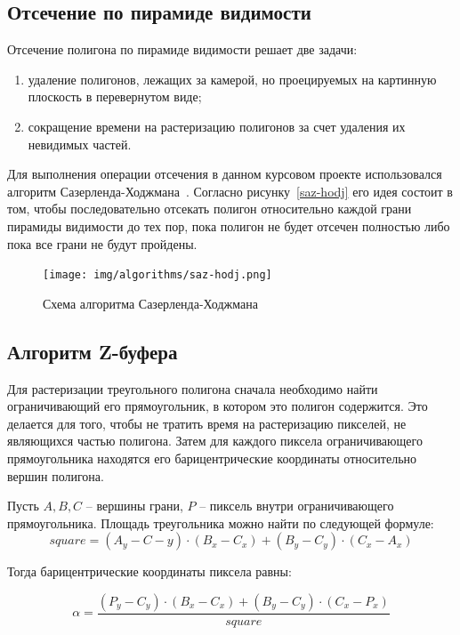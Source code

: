 \subsection{Отсечение по пирамиде видимости}

Отсечение полигона по пирамиде видимости решает две задачи:
\begin{enumerate}
	\item удаление полигонов, лежащих за камерой, но проецируемых на картинную плоскость в перевернутом виде;
	\item сокращение времени на растеризацию полигонов за счет удаления их невидимых частей.
\end{enumerate}

Для выполнения операции отсечения в данном курсовом проекте использовался алгоритм Сазерленда-Ходжмана~\cite{roders}. Согласно рисунку~\ref{saz-hodj} его идея состоит в том, чтобы последовательно отсекать полигон относительно каждой грани пирамиды видимости до тех пор, пока полигон не будет отсечен полностью либо пока все грани не будут пройдены.

\begin{figure}[h]
	\centering
	\texttt{[image: img/algorithms/sаz-hodj.png]}
	\caption{Схема алгоритма Сазерленда-Ходжмана}
	\label{fig:saz-hodj}
\end{figure}

\clearpage

\subsection{Алгоритм Z-буфера}

Для растеризации треугольного полигона сначала необходимо найти ограничивающий его прямоугольник, в котором это полигон содержится. 
Это делается для того, чтобы не тратить время на растеризацию пикселей, не являющихся частью полигона.
Затем для каждого пиксела ограничивающего прямоугольника находятся его барицентрические координаты относительно вершин полигона.

Пусть $A, B, C$ – вершины грани, $P$ – пиксель внутри ограничивающего прямоугольника.
Площадь треугольника можно найти по следующей формуле:
\begin{equation}
	square = (A_y - C-y) \cdot (B_x - C_x) + (B_y - C_y) \cdot (C_x - A_x)
\end{equation}

Тогда барицентрические координаты пиксела равны:

\begin{equation}
	\alpha=\frac{\left(P_y-C_y\right)\cdot\left(B_x-C_x\right)+\left(B_y-C_y\right)\cdot\left(C_x-P_x\right)}{square}
\end{equation}	

